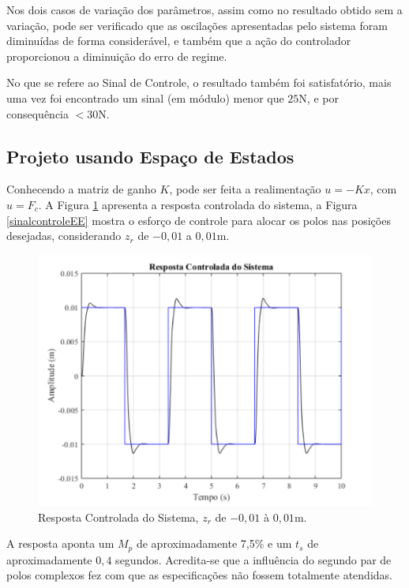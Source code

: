 \documentclass[journal,brazil,english]{IEEEtran}
\begin{document}
Nos dois casos de variação dos parâmetros, assim como no resultado obtido sem a variação, pode ser verificado que as oscilações apresentadas pelo sistema foram diminuídas de forma considerável, e também que a ação do controlador proporcionou a diminuição do erro de regime.

No que se refere ao Sinal de Controle, o resultado também foi satisfatório, mais uma vez foi encontrado um sinal (em módulo) menor que $25$N, e por consequência $< 30$N.

\subsection{Projeto usando Espaço de Estados}
Conhecendo a matriz de ganho $K$, pode ser feita a realimentação $u=-Kx$, com $u=F_c$. A Figura \ref{malhafechadaEE} apresenta a resposta controlada do sistema, a Figura \ref{sinalcontroleEE} mostra o esforço de controle para alocar os polos nas posições desejadas, considerando $z_r$ de $-0,01$ a $0,01$m.

\begin{figure}[H]
	\centering
\includegraphics[width=\columnwidth]{./imagens/resposta_controlada_sistema.pdf}
    \renewcommand{\figurename}{Fig.}
    \caption{Resposta Controlada do Sistema, $z_r$ de $-0,01$ à $0,01$m.}
	\label{malhafechadaEE}
\end{figure}
A resposta aponta um $M_p$ de aproximadamente 7,5\% e um $t_s$ de aproximadamente $0,4$ segundos. Acredita-se que a influência do segundo par de polos complexos fez com que as especificações não fossem totalmente atendidas.
\end{document}
